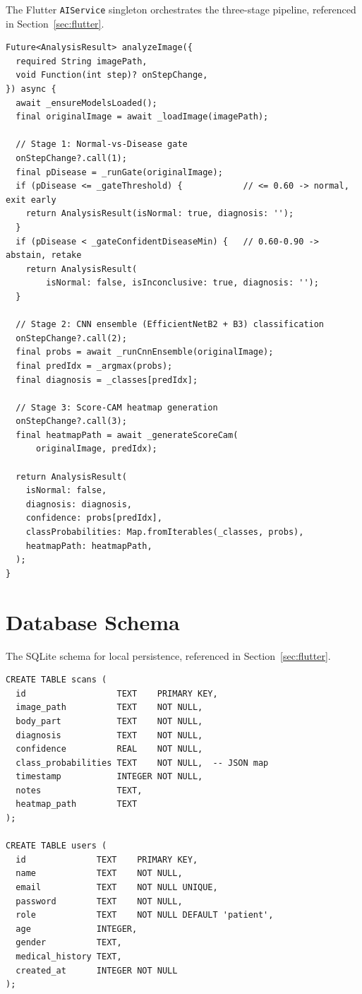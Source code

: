 The Flutter \texttt{AIService} singleton orchestrates the three-stage pipeline, referenced in Section~\ref{sec:flutter}.

\begin{verbatim}
Future<AnalysisResult> analyzeImage({
  required String imagePath,
  void Function(int step)? onStepChange,
}) async {
  await _ensureModelsLoaded();
  final originalImage = await _loadImage(imagePath);

  // Stage 1: Normal-vs-Disease gate
  onStepChange?.call(1);
  final pDisease = _runGate(originalImage);
  if (pDisease <= _gateThreshold) {            // <= 0.60 -> normal, exit early
    return AnalysisResult(isNormal: true, diagnosis: '');
  }
  if (pDisease < _gateConfidentDiseaseMin) {   // 0.60-0.90 -> abstain, retake
    return AnalysisResult(
        isNormal: false, isInconclusive: true, diagnosis: '');
  }

  // Stage 2: CNN ensemble (EfficientNetB2 + B3) classification
  onStepChange?.call(2);
  final probs = await _runCnnEnsemble(originalImage);
  final predIdx = _argmax(probs);
  final diagnosis = _classes[predIdx];

  // Stage 3: Score-CAM heatmap generation
  onStepChange?.call(3);
  final heatmapPath = await _generateScoreCam(
      originalImage, predIdx);

  return AnalysisResult(
    isNormal: false,
    diagnosis: diagnosis,
    confidence: probs[predIdx],
    classProbabilities: Map.fromIterables(_classes, probs),
    heatmapPath: heatmapPath,
  );
}
\end{verbatim}

\section{Database Schema}
\label{app:db_schema}

The SQLite schema for local persistence, referenced in Section~\ref{sec:flutter}.

\begin{verbatim}
CREATE TABLE scans (
  id                  TEXT    PRIMARY KEY,
  image_path          TEXT    NOT NULL,
  body_part           TEXT    NOT NULL,
  diagnosis           TEXT    NOT NULL,
  confidence          REAL    NOT NULL,
  class_probabilities TEXT    NOT NULL,  -- JSON map
  timestamp           INTEGER NOT NULL,
  notes               TEXT,
  heatmap_path        TEXT
);

CREATE TABLE users (
  id              TEXT    PRIMARY KEY,
  name            TEXT    NOT NULL,
  email           TEXT    NOT NULL UNIQUE,
  password        TEXT    NOT NULL,
  role            TEXT    NOT NULL DEFAULT 'patient',
  age             INTEGER,
  gender          TEXT,
  medical_history TEXT,
  created_at      INTEGER NOT NULL
);
\end{verbatim}

